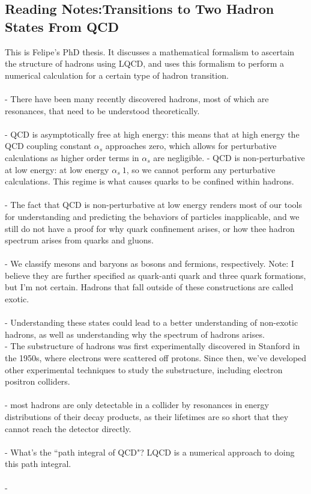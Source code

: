 \subsection{Reading Notes:Transitions to Two Hadron States From QCD}
This is Felipe's PhD thesis. It discusses a mathematical formalism to ascertain the structure of hadrons using LQCD, and uses this formalism to perform a numerical calculation for a certain type of hadron transition. \\\\
- There have been many recently discovered hadrons, most of which are resonances, that need to be understood theoretically. \\\\
- QCD is asymptotically free at high energy: this means that at high energy the QCD coupling constant $\alpha_s$ approaches zero, which allows for perturbative calculations as higher order terms in $\alpha_s$ are negligible. 
- QCD is non-perturbative at low energy: at low energy $\alpha_s ~ 1$, so we cannot perform any perturbative calculations. This regime is what causes quarks to be confined within hadrons. \\\\
- The fact that QCD is non-perturbative at low energy renders most of our tools for understanding and predicting the behaviors of particles inapplicable, and we still do not have a proof for why quark confinement arises, or how thee hadron spectrum arises from quarks and gluons.\\\\
- We classify mesons and baryons as bosons and fermions, respectively. Note: I believe they are further specified as quark-anti quark and three quark formations, but I'm not certain. Hadrons that fall outside of these constructions are called exotic. \\\\
- Understanding these states could lead to a better understanding of non-exotic hadrons, as well as understanding why the spectrum of hadrons arises. \\
- The substructure of hadrons was first experimentally discovered in Stanford in the 1950s, where electrons were scattered off protons. Since then, we've developed other experimental techniques to study the substructure, including electron positron colliders.\\\\ 
- most hadrons are only detectable in a  collider by resonances in energy distributions of their decay products, as their lifetimes are so short that they cannot reach the detector directly.\\\\
- What's the ``path integral of QCD"?  LQCD is a numerical approach to doing this path integral. \\\\
- 